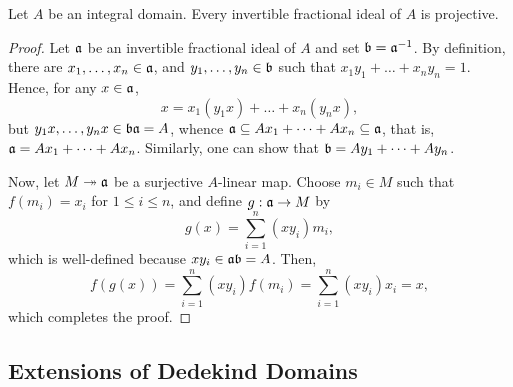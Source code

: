 \begin{proposition}
    Let $A$ be an integral domain. Every invertible fractional ideal of $A$ is projective.
\end{proposition}
\begin{proof}
    Let $\mathfrak{a}$ be an invertible fractional ideal of $A$ and set $\mathfrak{b} = \mathfrak{a}^{-1}$. By definition, there are $x_1,\dots,x_n\in\mathfrak{a}$, and $y_1,\dots,y_n\in\mathfrak{b}$ such that $x_1y_1 + \dots + x_ny_n = 1$. Hence, for any $x\in\mathfrak{a}$, 
    \begin{equation*}
        x = x_1(y_1x) + \dots + x_n(y_nx),
    \end{equation*}
    but $y_1x,\dots,y_n x\in\mathfrak{b}\mathfrak{a} = A$, whence $\mathfrak{a}\subseteq Ax_1 + \dots + Ax_n\subseteq\mathfrak{a}$, that is, $\mathfrak{a} = Ax_1 + \dots + Ax_n$. Similarly, one can show that $\mathfrak{b} = Ay_1 + \dots + Ay_n$.

    Now, let $M\twoheadrightarrow\mathfrak{a}$ be a surjective $A$-linear map. Choose $m_i\in M$ such that $f(m_i) = x_i$ for $1\le i\le n$, and define $g:\mathfrak{a}\to M$ by 
    \begin{equation*}
        g(x) = \sum_{i = 1}^n (xy_i)m_i,
    \end{equation*}
    which is well-defined because $xy_i\in\mathfrak{a}\mathfrak{b} = A$. Then, 
    \begin{equation*}
        f(g(x)) = \sum_{i = 1}^n (xy_i)f(m_i) = \sum_{i = 1}^n (xy_i)x_i = x,
    \end{equation*}
    which completes the proof.
\end{proof}

\subsection{Extensions of Dedekind Domains}

